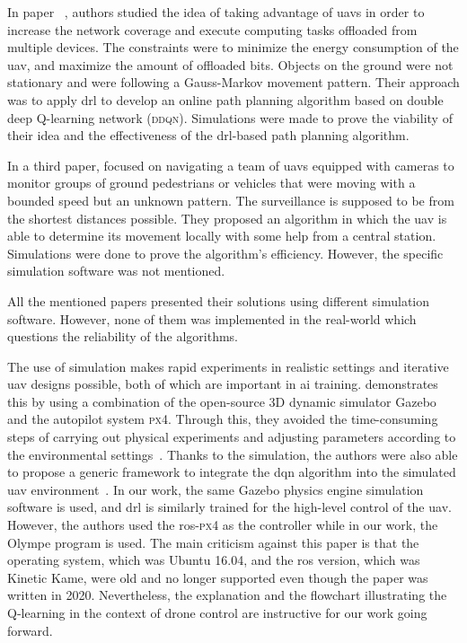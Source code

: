 \documentclass[../main.tex]{subfiles}
\begin{document}

In paper ~\cite{pen21}, authors \citeauthor{pen21} studied the idea 
of taking advantage of \glspl{uav} in order to increase the network
coverage and execute computing tasks offloaded from multiple devices. 
The constraints were to minimize the energy consumption of the \gls{uav}, 
and maximize the amount of offloaded bits. 
Objects on the ground were not stationary and were following a Gauss-Markov 
movement pattern. Their approach was to apply \gls{drl} to develop an online path planning algorithm based on double deep Q-learning network (\textsc{ddqn}).
Simulations were made to prove the viability of their idea and the 
effectiveness of the \gls{drl}-based path planning algorithm.

In a third paper, \citeauthor{hua21} focused on navigating a team
of \glspl{uav} equipped with cameras to monitor groups of ground 
pedestrians or vehicles that were moving with a bounded speed but an unknown pattern. 
The surveillance is supposed to be from the shortest distances possible. 
They proposed an algorithm in which the \gls{uav} is able to determine 
its movement locally with some help from a central station.
Simulations were done to prove the algorithm's efficiency. However, the 
specific simulation software was not mentioned. 

All the mentioned papers presented their solutions using different 
simulation software. However, none of them was implemented in the real-world which questions the reliability of the algorithms.


The use of simulation makes rapid experiments in realistic settings 
and iterative \gls{uav} designs possible, 
both of which are important in \gls{ai} training. 
\citeauthor{Zho20} demonstrates this by %
using a combination of the open-source 3D dynamic simulator Gazebo
and the autopilot system \textsc{px}4.
Through this, they avoided the time-consuming steps of 
carrying out physical experiments
and adjusting parameters according 
to the environmental settings~\cite{Zho20}.
Thanks to the simulation, 
the authors were also able to propose a generic
framework to integrate the \gls{dqn} algorithm into 
the simulated \gls{uav} environment~\cite{Zho20}.
In our work, the same Gazebo physics engine
simulation software is used, and \gls{drl} is similarly trained
for the high-level control of the \gls{uav}. 
However, the authors used the \gls{ros}-\textsc{px}4 as the controller 
while in our work, the Olympe program is used.
The main criticism against this paper is that the operating system,
which was Ubuntu 16.04, and 
the \gls{ros} version, which was Kinetic Kame, 
were old and no longer supported 
even though the paper was written in 2020.
Nevertheless, the explanation and the flowchart illustrating the 
Q-learning in the context of drone control are instructive 
for our work going forward.
\end{document}
